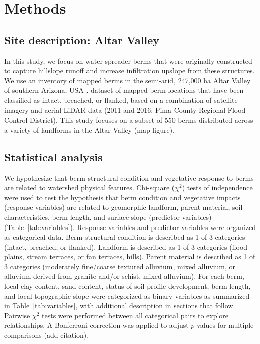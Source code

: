 \documentclass[review]{elsarticle}
\begin{document}

\section{Methods}
\subsection{Site description: Altar Valley}
\label{sec:Altar}
In this study, we focus on water spreader berms that were originally constructed to capture hillslope runoff and increase infiltration upslope from these structures. We use an inventory of mapped berms in the semi-arid, 247,000 ha Altar Valley of southern Arizona, USA \cite{nichols2021landscape}.  \citet{nichols2021landscape} dataset of mapped berm locations that have been classified as intact, breached, or flanked, based on a combination of satellite imagery and aerial LiDAR data (2011 and 2016; Pima County Regional Flood Control District). This study focuses on a subset of 550 berms distributed across a variety of landforms in the Altar Valley (map figure).  

\subsection{Statistical analysis}
We hypothesize that berm structural condition and vegetative response to berms are related to watershed physical features. Chi-square ($\chi^2$) tests of independence were used to test the hypothesis that berm condition and vegetative impacts (response variables) are related to geomorphic landform, parent material, soil characteristics, berm length, and surface slope (predictor variables) (Table~\ref{tab:variables}). 
Response variables and predictor variables were organized as categorical data. 
Berm structural condition is described as 1 of 3 categories (intact, breached, or flanked). Landform is described as 1 of 3 categories (flood plains, stream terraces, or fan terraces, hills). Parent material is described as 1 of 3 categories (moderately fine/coarse textured alluvium, mixed alluvium, or alluvium derived from granite and/or schist, mixed alluvium).
For each berm, local clay content, sand content, status of soil profile development, berm length, and local topographic slope were categorized as binary variables as summarized in Table~\ref{tab:variables}, with additional description in sections that follow. Pairwise $\chi^2$ tests were performed between all categorical pairs to explore relationships. A Bonferroni correction was applied to adjust $p$-values for multiple comparisons (add citation).
\end{document}
